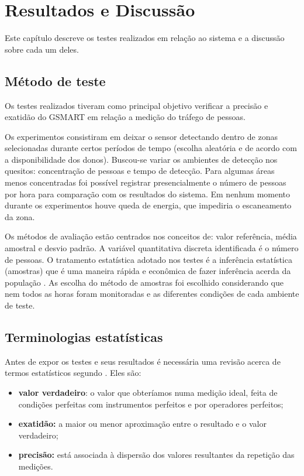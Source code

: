 \chapter{Resultados e Discussão}
\label{resultados-discussao}

Este capítulo descreve os testes realizados em relação ao sistema e a discussão sobre cada um deles.

\section{Método de teste}
\label{metodo-teste}
Os testes realizados tiveram como principal objetivo verificar a precisão e exatidão do GSMART em relação a
medição do tráfego de pessoas.

Os experimentos consistiram em deixar o sensor detectando dentro de zonas
selecionadas durante certos períodos de tempo (escolha aleatória e de acordo com a disponibilidade
dos donos). Buscou-se variar os ambientes de
detecção nos quesitos: concentração de pessoas e tempo de detecção. Para algumas
áreas menos concentradas foi possível registrar presencialmente o número de
pessoas por hora para comparação com os resultados do sistema. Em nenhum momento durante os experimentos
houve queda de energia, que impediria o escaneamento da zona.

Os métodos de avaliação estão centrados nos conceitos de: valor referência, média amostral e desvio padrão.
A variável quantitativa discreta identificada é o número de pessoas. O tratamento estatística adotado nos testes
é a inferência estatística (amostras) que é uma maneira rápida e econômica de fazer
inferência acerda da população \cite{Cabral2004}. As escolha do método de amostras
foi escolhido considerando que nem todos as horas foram monitoradas e as diferentes condições de
cada ambiente de teste.

\section{Terminologias estatísticas}
Antes de expor os testes e seus resultados é necessária uma revisão acerca de termos estatísticos segundo . Eles são:
\begin{itemize}
    \item \textbf{valor verdadeiro}: o valor que obteríamos numa medição ideal, feita de condições
    perfeitas com instrumentos perfeitos e por operadores perfeitos;
    \item \textbf{exatidão:} a maior ou menor aproximação entre o resultado e o valor verdadeiro;
    \item \textbf{precisão:} está associada à dispersão dos valores resultantes da repetição das medições.
\end{itemize}

